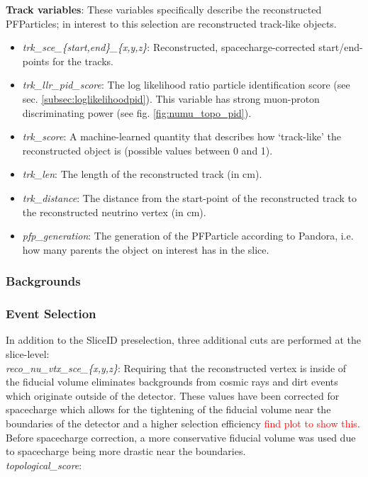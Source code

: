 \par \noindent \textbf{Track variables}: These variables specifically describe the reconstructed PFParticles; in interest to this selection are reconstructed track-like objects. 
\begin{itemize}
    \item \emph{trk\_sce\_\{start,end\}\_\{x,y,z\}}: Reconstructed, spacecharge-corrected start/end-points for the tracks.
    \item \emph{trk\_llr\_pid\_score}: The log likelihood ratio particle identification score (see sec. \ref{subsec:loglikelihoodpid}). This variable has strong muon-proton discriminating power (see fig. \ref{fig:numu_topo_pid}).
    \item \emph{trk\_score}: A machine-learned quantity that describes how `track-like' the reconstructed object is (possible values between 0 and 1).
    \item \emph{trk\_len}: The length of the reconstructed track (in cm).
    \item \emph{trk\_distance}: The distance from the start-point of the reconstructed track to the reconstructed neutrino vertex (in cm).
    \item \emph{pfp\_generation}: The generation of the PFParticle according to Pandora, i.e. how many parents the object on interest has in the slice.
\end{itemize}

\subsubsection{Backgrounds}
\label{sssec:NuMUCCsel:sel:bkgrnds}

\subsubsection{Event Selection}
\label{sssec:NuMUCCsel:sel:evt}
\par In addition to the SliceID preselection, three additional cuts are performed at the slice-level:\\
\emph{reco\_nu\_vtx\_sce\_\{x,y,z\}}: Requiring that the reconstructed vertex is inside of the fiducial volume eliminates backgrounds from cosmic rays and dirt events which originate outside of the detector. These values have been corrected for spacecharge which allows for the tightening of the fiducial volume near the boundaries of the detector and a higher selection efficiency \textcolor{red}{find plot to show this}. Before spacecharge correction, a more conservative fiducial volume was used due to spacecharge being more drastic near the boundaries.\\
\emph{topological\_score}:

